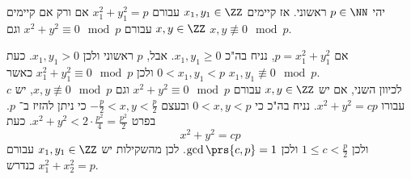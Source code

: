\documentclass[a4paper,10pt,twoside,openany]{book}
\begin{document}
\begin{corollary}
יהי
$p \in \NN$
ראשוני. אז קיימים
$x_1,y_1 \in \ZZ$
עבורם
$x_1^2 + y_1^2 = p$
אם ורק אם קיימים
$x,y \in \ZZ$
עבורם
$x^2 + y^2 \equiv 0 \mod{p}$
וגם
$x,y \not\equiv 0 \mod{p}$.
\end{corollary}
\begin{proposition}
אם
$p = x_1^2 + y_1^2$,
נניח בה"כ
$x_1, y_1 \geq 0$.
אבל,
$p$
ראשוני ולכן
$x_1, y_1 > 0$.
כעת
$0 < x_1,y_1 < p$
ולכן
$x_1^2 + y_1^2 \equiv 0 \mod{p}$
כאשר
$x_1,y_1 \not\equiv 0 \mod{p}$.\\
לכיוון השני, אם יש
$x,y \in \ZZ$
עבורם
$x^2 + y^2 \equiv 0 \mod{p}$
וגם
$x,y \not\equiv 0 \mod{p}$,
יש
$c$
עבורו
$x^2 + y^2 = cp$.
נניח בה"כ כי
$0<x,y<p$
ובעצם
$-\frac{p}{2} < x,y < \frac{p}{2}$
כי ניתן להזיז ב־%
$p$.
בפרט
$x^2 + y^2 < 2 \cdot \frac{p^2}{4} = \frac{p^2}{2}$.
כעת
\[x^2 + y^2 = cp\]
ולכן
$1 \leq c < \frac{p}{2}$
ולכן
$\gcd\prs{c,p} = 1$.
לכן מהשקילות יש
$x_1,y_1 \in \ZZ$
עבורם
$x_1^2 + x_2^2 = p$
כנדרש.
\end{proposition}
\backmatter
\end{document}

